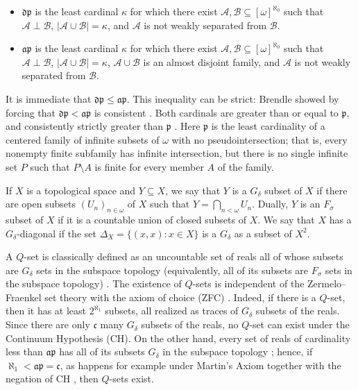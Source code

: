 \begin{itemize}
    \item $\mathfrak{dp}$ is the least cardinal $\kappa$ for which there exist $\mathcal A,\mathcal B\subseteq[\omega]^{\aleph_0}$ such that $\mathcal A\perp\mathcal B$, $|\mathcal A\cup\mathcal B|=\kappa$, and $\mathcal A$ is not weakly separated from $\mathcal B$.
    \item $\mathfrak{ap}$ is the least cardinal $\kappa$ for which there exist $\mathcal A,\mathcal B\subseteq[\omega]^{\aleph_0}$ such that $\mathcal A\perp\mathcal B$, $|\mathcal A\cup\mathcal B|=\kappa$, $\mathcal A\cup\mathcal B$ is an almost disjoint family, and $\mathcal A$ is not weakly separated from $\mathcal B$.
\end{itemize}

It is immediate that $\mathfrak{dp}\leq\mathfrak{ap}$.
This inequality can be strict: Brendle showed by forcing that
$\mathfrak{dp}<\mathfrak{ap}$ is consistent \cite{brendle1999dow}.
Both cardinals are greater than or equal to $\mathfrak p$, and consistently
strictly greater than $\mathfrak p$ \cite{brendle1999dow}. Here $\mathfrak p$ is the least
cardinality of a centered family of infinite subsets of $\omega$ with no
pseudointersection; that is, every nonempty finite subfamily has infinite
intersection, but there is no single infinite set $P$ such that
$P\setminus A$ is finite for every member $A$ of the family.

If $X$ is a topological space and $Y\subseteq X$, we say that $Y$ is a $G_\delta$ subset of $X$ if there are open subsets $(U_n)_{n \in \omega}$ of $X$ such that $Y=\bigcap_{n<\omega} U_n$.
Dually, $Y$ is an $F_\sigma$ subset of $X$ if it is a countable union of closed subsets of $X$.
We say that $X$ has a $G_\delta$-diagonal if the set $\Delta_X=\{(x,x):x\in X\}$ is a $G_\delta$ as a subset of $X^2$.

A $Q$-set is classically defined as an uncountable set of reals all of whose subsets are
$G_\delta$ sets in the subspace topology (equivalently, all of its subsets are
$F_\sigma$ sets in the subspace topology) \cite{miller1984special,fleissner1980qsets}. The existence of $Q$-sets is independent of the Zermelo--Fraenkel set theory with the axiom of choice (ZFC) \cite{fleissner1980qsets,miller1984special}. Indeed, if
there is a $Q$-set, then it has at least $2^{\aleph_1}$ subsets, all realized as
traces of $G_\delta$ subsets of the reals. Since there are only $\mathfrak c$
many $G_\delta$ subsets of the reals, no $Q$-set can exist under the Continuum
Hypothesis (CH). On the other hand, every set of reals of cardinality less than
$\mathfrak{ap}$ has all of its subsets $G_\delta$ in the subspace topology
\cite{brendle1999dow}; hence, if
$\aleph_1<\mathfrak{ap}=\mathfrak c$, as happens for example under Martin's
Axiom together with the negation of CH \cite{blass2009combinatorial}, then $Q$-sets
exist.

